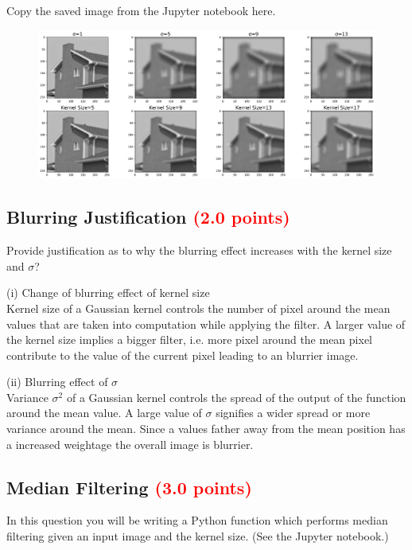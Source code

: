 \documentclass[answers]{exam}
\newcommand{\mypoints}[1]{\textcolor{red}{(#1 points)}}
\begin{document}
Copy the saved image from the Jupyter notebook here.
\begin{solution}
\begin{figure}[H]
    \centering
    \includegraphics[width=1.0\linewidth]{Images/question_3_3.pdf}
\end{figure}
\end{solution}

\subsection{Blurring Justification \mypoints{2.0}}

Provide justification as to why the blurring effect increases with the kernel size and $\sigma$?


\begin{solution}
(i) Change of blurring effect of kernel size\\
Kernel size of a Gaussian kernel controls the number of pixel around the mean values that are taken into computation while applying the filter. A larger value of the kernel size implies a bigger filter, i.e. more pixel around the mean pixel contribute to the value of the current pixel leading to an blurrier image.

(ii) Blurring effect of $\sigma$\\
Variance $\sigma^2$ of a Gaussian kernel controls the spread of the output of the function around the mean value. A large value of $\sigma$ signifies a wider spread or more variance around the mean. Since a values father away from the mean position has a increased weightage the overall image is blurrier.

\end{solution}

\subsection{Median Filtering \mypoints{3.0}}
In this question you will be writing a Python function which performs median filtering given an input image and the kernel size. (See the Jupyter notebook.)
\end{document}
